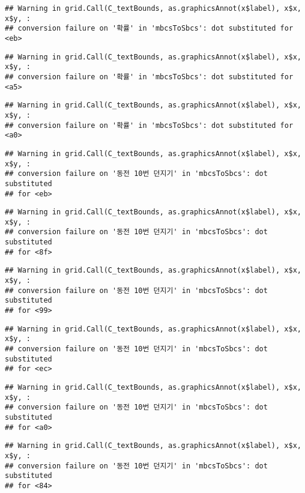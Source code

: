 \documentclass[]{book}
\begin{document}
\begin{verbatim}
## Warning in grid.Call(C_textBounds, as.graphicsAnnot(x$label), x$x, x$y, :
## conversion failure on '확률' in 'mbcsToSbcs': dot substituted for <eb>
\end{verbatim}

\begin{verbatim}
## Warning in grid.Call(C_textBounds, as.graphicsAnnot(x$label), x$x, x$y, :
## conversion failure on '확률' in 'mbcsToSbcs': dot substituted for <a5>
\end{verbatim}

\begin{verbatim}
## Warning in grid.Call(C_textBounds, as.graphicsAnnot(x$label), x$x, x$y, :
## conversion failure on '확률' in 'mbcsToSbcs': dot substituted for <a0>
\end{verbatim}

\begin{verbatim}
## Warning in grid.Call(C_textBounds, as.graphicsAnnot(x$label), x$x, x$y, :
## conversion failure on '동전 10번 던지기' in 'mbcsToSbcs': dot substituted
## for <eb>
\end{verbatim}

\begin{verbatim}
## Warning in grid.Call(C_textBounds, as.graphicsAnnot(x$label), x$x, x$y, :
## conversion failure on '동전 10번 던지기' in 'mbcsToSbcs': dot substituted
## for <8f>
\end{verbatim}

\begin{verbatim}
## Warning in grid.Call(C_textBounds, as.graphicsAnnot(x$label), x$x, x$y, :
## conversion failure on '동전 10번 던지기' in 'mbcsToSbcs': dot substituted
## for <99>
\end{verbatim}

\begin{verbatim}
## Warning in grid.Call(C_textBounds, as.graphicsAnnot(x$label), x$x, x$y, :
## conversion failure on '동전 10번 던지기' in 'mbcsToSbcs': dot substituted
## for <ec>
\end{verbatim}

\begin{verbatim}
## Warning in grid.Call(C_textBounds, as.graphicsAnnot(x$label), x$x, x$y, :
## conversion failure on '동전 10번 던지기' in 'mbcsToSbcs': dot substituted
## for <a0>
\end{verbatim}

\begin{verbatim}
## Warning in grid.Call(C_textBounds, as.graphicsAnnot(x$label), x$x, x$y, :
## conversion failure on '동전 10번 던지기' in 'mbcsToSbcs': dot substituted
## for <84>
\end{verbatim}
\end{document}
